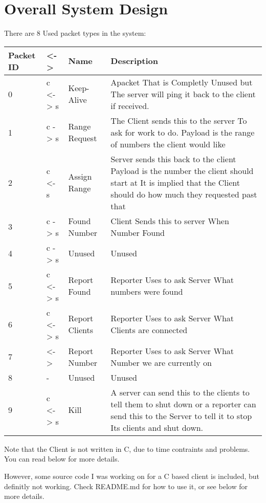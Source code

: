 \documentclass[letterpaper,10pt,titlepage]{article}
\begin{document}
\tableofcontents

\section{Overall System Design}

There are 8 Used packet types in the system:

\begin{center}
    \begin{tabular}{ | l | l | l | p{5cm} |}
    \hline
    Packet ID & <-> & Name & Description \\ \hline
    0 & c <-> s & Keep-Alive & Apacket That is Completly Unused but   
    The server will ping it back to the client if received. \\ \hline
    1 & c -> s & Range Request & The Client sends this to the server
    To ask for work to do.  Payload is the range
    of numbers the client would like \\ \hline
    2 & c <- s & Assign Range & Server sends this back to the client
    Payload is the number the client should start at
    It is implied that the Client should do how much they requested past that \\ \hline
	3 & c -> s & Found Number & Client Sends this to server When Number Found \\ \hline
	4 & c -> s & Unused & Unused \\ \hline
	5 & c <-> s & Report Found & Reporter Uses to ask Server What numbers were found \\ \hline
	6 & c <-> s & Report Clients & Reporter Uses to ask Server What Clients are connected \\ \hline
	7 & <-> & Report Number & Reporter Uses to ask Server What Number we are currently on \\ \hline
	8 & - & Unused & Unused \\ \hline
	9 & c <-> s & Kill & A server can send this to the clients to tell them to shut down
    or a reporter can send this to the Server to tell it to stop
	Its clients and shut down.\\ \hline
    \end{tabular}
\end{center}

Note that the Client is not written in C, due to time contraints and problems.  You can read below for more details.

However, some source code I was working on for a C based client is included, but definitly not working.  Check README.md for how to use it, or see below for more details.
\end{document}
